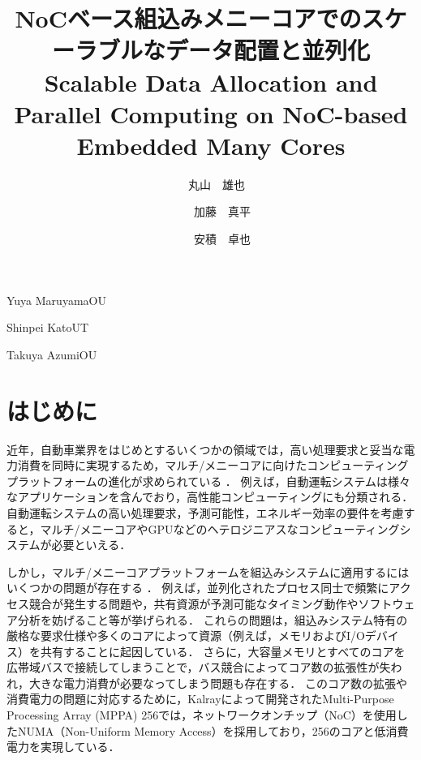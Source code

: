 \documentclass[submit,techrep]{ipsj_v2/UTF8/ipsj}
\begin{document}
\title{
    {\Huge NoCベース組込みメニーコアでのスケーラブルなデータ配置と並列化}
  \\{\huge Scalable Data Allocation and Parallel Computing on NoC-based Embedded Many Cores}
}

\etitle{\vspace{-3.5cm}}



\author{　{\LARGE 丸山　雄也}}{{\Large Yuya Maruyama}}{OU}%
\author{　　{\LARGE 加藤　真平}}{{\Large Shinpei Kato}}{UT}%
\author{　　{\LARGE 安積　卓也}}{{\Large Takuya Azumi}}{OU}%

\maketitle

\pagestyle{empty} \thispagestyle{fancy}

\section{はじめに}
近年，自動車業界をはじめとするいくつかの領域では，高い処理要求と妥当な電力消費を同時に実現するため，マルチ/メニーコアに向けたコンピューティングプラットフォームの進化が求められている \cite{becker2016contention} \cite{faragardi2014communication} \cite{perret2016mapping}．
例えば，自動運転システムは様々なアプリケーションを含んでおり，高性能コンピューティングにも分類される．
自動運転システムの高い処理要求，予測可能性，エネルギー効率の要件を考慮すると，マルチ/メニーコアやGPUなどのヘテロジニアスなコンピューティングシステムが必要といえる．

しかし，マルチ/メニーコアプラットフォームを組込みシステムに適用するにはいくつかの問題が存在する \cite{becker2016contention} \cite{saidi2015shift}．
例えば，並列化されたプロセス同士で頻繁にアクセス競合が発生する問題や，共有資源が予測可能なタイミング動作やソフトウェア分析を妨げること等が挙げられる．
これらの問題は，組込みシステム特有の厳格な要求仕様や多くのコアによって資源（例えば，メモリおよびI/Oデバイス）を共有することに起因している．
さらに，大容量メモリとすべてのコアを広帯域バスで接続してしまうことで，バス競合によってコア数の拡張性が失われ，大きな電力消費が必要なってしまう問題も存在する．
このコア数の拡張や消費電力の問題に対応するために，Kalrayによって開発されたMulti-Purpose Processing Array (MPPA) 256では，ネットワークオンチップ（NoC）を使用したNUMA（Non-Uniform Memory Access）を採用しており，256のコアと低消費電力を実現している．
\end{document}
